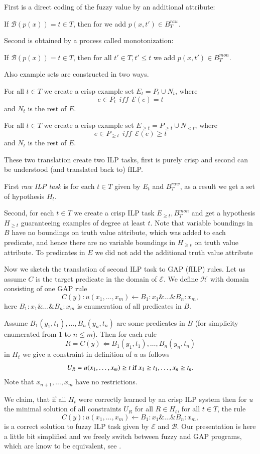\documentclass[authoryear,12pt]{elsarticle}
\begin{document}
First is a direct coding of the fuzzy value by an additional attribute:

If ${\mathcal B}(p(x))=t\in T$, then for we add $p(x,t')\in {B}^{raw}_T$.

Second is obtained by a process called monotonization:

If ${\mathcal B}(p(x))=t\in T$, then for all $t'\in T, t'\le t$ we add $p(x,t')\in {B}^{mon}_T$.

Also example sets are constructed in two ways.

For all $t\in T$ we create a crisp example set $E_t=P_t\cup N_t$, where 
$$e\in P_t \ \ iff \ \ {\mathcal E}(e)= t$$
and $N_t$ is the rest of $E$.


For all $t\in T$ we create a crisp example set $E_{\ge t}=P_{\ge t}\cup N_{< t}$, where 
$$e\in P_{\ge t} \ \ iff \ \ {\mathcal E}(e)\ge t$$
and $N_t$ is the rest of $E$.

These two translation create two ILP tasks, first is purely crisp and second can be understood (and translated back to) fILP.

First \textit{raw ILP task} is for each $t\in T$ given by $E_t$ and $B^{raw}_{T}$, as a result we get a set of hypothesis $H_t$.

Second, for each $t\in T$ we create a crisp ILP task $E_{\ge t}, {B}^{mon}_T$ and get a hypothesis $H_{\ge t}$ guaranteeing examples of degree at least $t$. Note that variable boundings in $B$ have no boundings on truth value attribute, which was added to each predicate, and hence there are no variable boundings in $H_{\ge t}$ on truth value attribute. To predicates in $E$ we did not add the additional truth value attribute

Now we sketch the translation of second ILP task to GAP (fILP) rules. Let us assume $C$ is the target predicate in the domain of ${\mathcal E}$. We define ${\mathcal H}$ with domain consisting of one GAP rule $$C(y):u(x_1,\dots,x_m)\leftarrow B_1:x_1 \&\dots\& B_n:x_m,$$
here $B_1:x_1 \&\dots\& B_n:x_m$ is enumeration of all predicates in $B$.

Assume $B_1(y_1,t_1),\dots,B_n(y_n,t_n)$ are some predicates in $B$ (for simplicity enumerated from 1 to $n\le m$). Then for each rule 
$$R=C(y)\Leftarrow B_1(y_1,t_1),\dots,B_n(y_n,t_n)$$
in $H_t$ we give a constraint in definition of $u$ as follows
$$
U_R=u(x_1,\dots,x_m)\ge t \hbox{ if }x_1\ge t_1,\dots,x_n\ge t_n.
$$
Note that $x_{n+1},\dots,x_m$ have no restrictions.

We claim, that if all $H_t$ were correctly learned by an crisp ILP system then for $u$ the minimal solution of all constraints $U_R$ for all $R\in H_t$, for all $t\in T$, the rule
$$
C(y):u(x_1,\dots,x_m)\leftarrow B_1:x_1 \&\dots\& B_n:x_m,
$$
is a correct solution to fuzzy ILP task given by ${\mathcal E}$ and ${\mathcal B}$. Our presentation is here a little bit simplified and we freely switch between fuzzy and GAP programs, which are know to be equivalent, see  \citep{biblio:KLV}.
\end{document}
